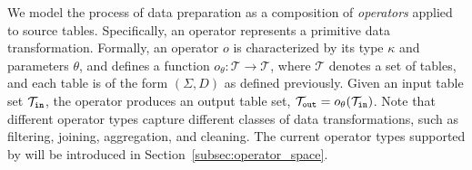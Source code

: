 %

We model the process of data preparation as a composition of \emph{operators} applied to source tables.
Specifically, an operator represents a primitive data transformation. 
%
Formally, an operator $o$ is characterized by its type $\kappa$ and parameters $\theta$, and defines a function $o_{\theta}: \mathcal{T} \rightarrow \mathcal{T}$, where $\mathcal{T}$ denotes a set of tables, and each table is of the form $(\Sigma, D)$ as defined previously. Given an input table set $\mathcal{T}_{\tt in}$, the operator produces an output table set, \ie $\mathcal{T}_{\tt out}=o_{\theta}(\mathcal{T}_{\tt in})$.
Note that different operator types capture different classes of data transformations, such as filtering, joining, aggregation, and cleaning. The current operator types supported by \sys will be introduced in Section~\ref{subsec:operator_space}.

